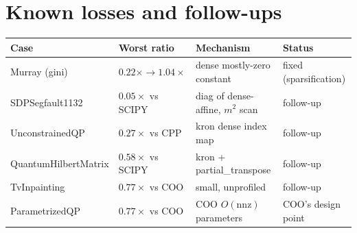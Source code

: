 \documentclass[11pt]{article}
\begin{document}
\section{Known losses and follow-ups}
\begin{table}[h]\centering\small
\begin{tabular}{llll}
\toprule
Case & Worst ratio & Mechanism & Status \\
\midrule
Murray (gini) & $0.22\times \to \mathbf{1.04\times}$ & dense mostly-zero constant & fixed (sparsification) \\
SDPSegfault1132 & $0.05\times$ vs SCIPY & diag of dense-affine, $m^2$ scan & follow-up \\
UnconstrainedQP & $0.27\times$ vs CPP & kron dense index map & follow-up \\
QuantumHilbertMatrix & $0.58\times$ vs SCIPY & kron + partial\_transpose & follow-up \\
TvInpainting & $0.77\times$ vs COO & small, unprofiled & follow-up \\
ParametrizedQP & $0.77\times$ vs COO & COO $O(\mathrm{nnz})$ parameters & COO's design point\footnotemark \\
\bottomrule
\end{tabular}
\end{table}
\end{document}
